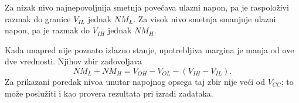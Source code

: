 Za nizak nivo najnepovoljnija smetnja povećava ulazni napon, pa je raspoloživi razmak do granice $V_{IL}$ jednak $NM_L$. Za visok nivo smetnja smanjuje ulazni napon, pa je razmak do $V_{IH}$ jednak $NM_H$.

Kada unapred nije poznato izlazno stanje, upotrebljiva margina je manja od ove dve vrednosti. Njihov zbir zadovoljava
\[NM_L+NM_H=V_{OH}-V_{OL}-(V_{IH}-V_{IL}).\]
Za prikazani poredak nivoa unutar napojnog opsega taj zbir nije veći od $V_{CC}$; to može poslužiti i kao provera rezultata pri izradi zadataka.
